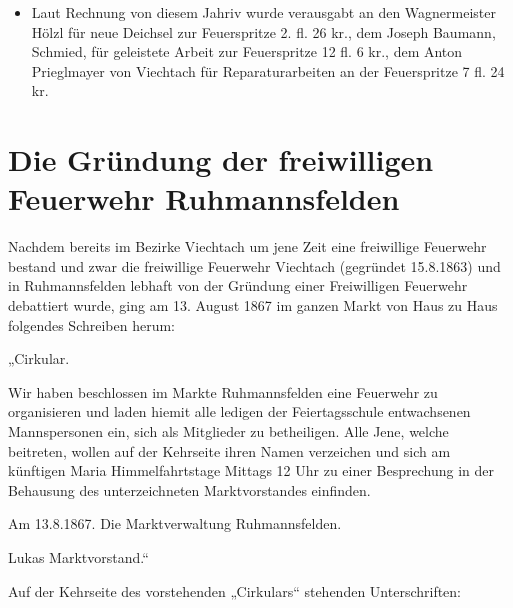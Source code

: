 \documentclass[12pt,a4paper]{book}
\begin{document}
\begin{itemize}
\item Laut Rechnung von diesem Jahriv wurde verausgabt an den Wagnermeister
Hölzl für neue Deichsel zur Feuerspritze 2. fl. 26 kr., dem Joseph Baumann,
Schmied, für geleistete Arbeit zur Feuerspritze 12 fl. 6 kr., dem Anton
Prieglmayer von Viechtach für Reparaturarbeiten an der Feuerspritze 7 fl. 24 kr.
\end{itemize}

\chapter{Die Gründung der freiwilligen Feuerwehr Ruhmannsfelden}

Nachdem bereits im Bezirke Viechtach um jene Zeit eine freiwillige Feuerwehr
bestand und zwar die freiwillige Feuerwehr Viechtach (gegründet 15.8.1863) und
in Ruhmannsfelden lebhaft von der Gründung einer Freiwilligen Feuerwehr
debattiert wurde, ging am 13. August 1867 im ganzen Markt von Haus zu Haus
folgendes Schreiben herum:

„Cirkular.

Wir haben beschlossen im Markte Ruhmannsfelden eine Feuerwehr zu organisieren
und laden hiemit alle ledigen der Feiertagsschule entwachsenen Mannspersonen
ein, sich als Mitglieder zu betheiligen. Alle Jene, welche beitreten, wollen auf
der Kehrseite ihren Namen verzeichen und sich am künftigen Maria
Himmelfahrtstage Mittags 12 Uhr zu einer Besprechung in der Behausung des
unterzeichneten Marktvorstandes einfinden.

Am 13.8.1867. Die Marktverwaltung Ruhmannsfelden.

Lukas Marktvorstand.“

Auf der Kehrseite des vorstehenden „Cirkulars“ stehenden Unterschriften:
\end{document}
